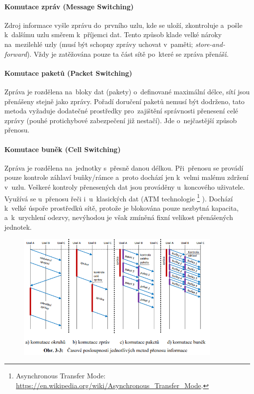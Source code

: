 \paragraph{Komutace zpráv (Message Switching)} Zdroj informace vyšle zprávu do~prvního uzlu, kde se uloží, zkontroluje a~pošle k~dalšímu uzlu směrem k~příjemci dat. Tento způsob klade velké nároky na~mezilehlé uzly (musí být schopny zprávy uchovat v~paměti; \emph{store-and-forward}). Vždy je zatěžována pouze ta část sítě po~které se zpráva přenáší.

\paragraph{Komutace paketů (Packet Switching)} Zpráva je rozdělena na~bloky dat (pakety) o~definované maximální délce, sítí jsou přenášeny stejně jako zprávy. Pořadí doručení paketů nemusí být dodrženo, tato metoda vyžaduje dodatečné prostředky pro~zajištění správnosti přenesení celé zprávy (pouhé protichybové zabezpečení již nestačí). Jde o~nejčastější způsob přenosu.

\paragraph{Komutace buněk (Cell Switching)} Zpráva je rozdělena na~jednotky s~přesně danou délkou. Při~přenosu se provádí pouze kontrole záhlaví buňky/rámce a~proto dochází jen k~velmi malému zdržení v~uzlu. Veškeré kontroly přenesených dat jsou prováděny u~koncového uživatele. Využívá se u~přenosu řeči i~u~klasických dat (ATM technologie%
\footnote{Asynchronous Transfer Mode: \url{https://en.wikipedia.org/wiki/Asynchronous_Transfer_Mode}.}%
). Dochází k~velké úspoře prostředků sítě, protože je blokována pouze nezbytná kapacita, a~k~urychlení odezvy, nevýhodou je však zmíněná fixní velikost přenášených jednotek.

\begin{figure}[ht]
	\centering
	\includegraphics[width=0.9\textwidth]{images/q01_switching}
\end{figure}


